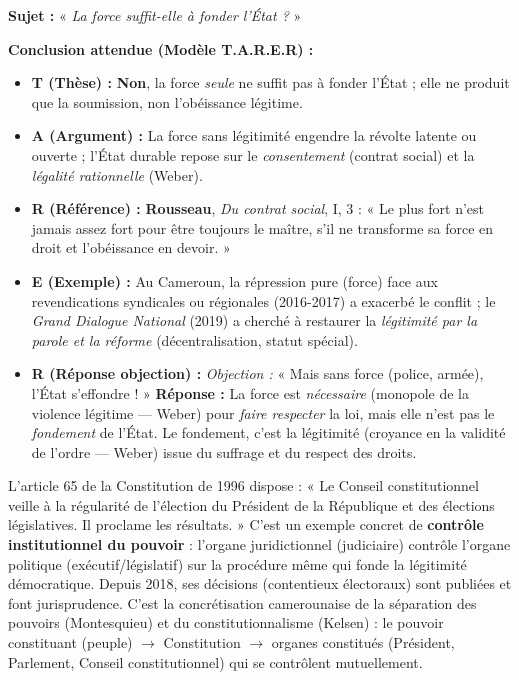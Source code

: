 \documentclass[11pt]{article}
\newcommand{\cle}[1]{{\popxbold\color{popdark}#1}}
\begin{document}
\begin{exemplebox}
\textbf{Sujet :} « \emph{La force suffit-elle à fonder l'État ?} »

\textbf{Conclusion attendue (Modèle T.A.R.E.R) :}
\begin{itemize}
    \item \textbf{T (Thèse) :} \textbf{Non}, la force \emph{seule} ne suffit pas à fonder l'État ; elle ne produit que la soumission, non l'obéissance légitime.
    \item \textbf{A (Argument) :} La force sans légitimité engendre la révolte latente ou ouverte ; l'État durable repose sur le \emph{consentement} (contrat social) et la \emph{légalité rationnelle} (Weber).
    \item \textbf{R (Référence) :} \textbf{Rousseau}, \emph{Du contrat social}, I, 3 : « Le plus fort n'est jamais assez fort pour être toujours le maître, s'il ne transforme sa force en droit et l'obéissance en devoir. »
    \item \textbf{E (Exemple) :} Au Cameroun, la répression pure (force) face aux revendications syndicales ou régionales (2016-2017) a exacerbé le conflit ; le \emph{Grand Dialogue National} (2019) a cherché à restaurer la \emph{légitimité par la parole et la réforme} (décentralisation, statut spécial).
    \item \textbf{R (Réponse objection) :} \emph{Objection :} « Mais sans force (police, armée), l'État s'effondre ! » \textbf{Réponse :} La force est \emph{nécessaire} (monopole de la violence légitime — Weber) pour \emph{faire respecter} la loi, mais elle n'est pas le \emph{fondement} de l'État. Le fondement, c'est la \cle{légitimité} (croyance en la validité de l'ordre — Weber) issue du suffrage et du respect des droits.
\end{itemize}
\end{exemplebox}

\begin{savaistu}
L'article 65 de la Constitution de 1996 dispose : « Le Conseil constitutionnel veille à la régularité de l'élection du Président de la République et des élections législatives. Il proclame les résultats. » C'est un exemple concret de \textbf{contrôle institutionnel du pouvoir} : l'organe juridictionnel (judiciaire) contrôle l'organe politique (exécutif/législatif) sur la procédure même qui fonde la \cle{légitimité démocratique}. Depuis 2018, ses décisions (contentieux électoraux) sont publiées et font jurisprudence. C'est la concrétisation camerounaise de la \cle{séparation des pouvoirs} (Montesquieu) et du \cle{constitutionnalisme} (Kelsen) : le pouvoir constituant (peuple) $\rightarrow$ Constitution $\rightarrow$ organes constitués (Président, Parlement, Conseil constitutionnel) qui se contrôlent mutuellement.
\end{savaistu}
\end{document}
